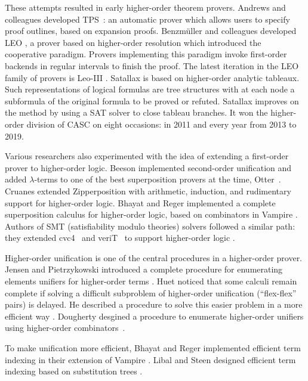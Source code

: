 These attempts resulted in early higher-order theorem provers. Andrews and
colleagues developed TPS~\cite{abinpx-96-tps}: an automatic prover which allows
users to specify proof outlines, based on expansion proofs. Benzm\"uller and
colleagues developed LEO \cite{cbmk-98-leo}, a prover based on higher-order
resolution which introduced the cooperative paradigm. Provers implementing this
paradigm invoke first-order backends in regular intervals to finish the proof.
The latest iteration in the LEO family of provers is Leo-III \cite{sb-21-leo3}.
Satallax \cite{cb-12-satallax} is based on higher-order analytic tableaux. Such
representations of logical formulas are tree structures with at each node a
subformula of the original formula to be proved or refuted. Satallax improves on
the method by using a SAT solver to close tableau branches.
It won the higher-order division of CASC on eight occasions: in 2011 and every
year from 2013 to 2019.

Various researchers also experimented with the idea of extending a first-order
prover to higher-order logic. Beeson \cite{mb-04-lam-logic} implemented second-order
unification and added $\lambda$-terms to one of the best superposition
provers at the time, Otter~\cite{mcc-03-otter}. Cruanes extended Zipperposition
\cite{sc-15-simon-phd,sc-supind-17} with arithmetic, induction, and rudimentary support for
higher-order logic. Bhayat and Reger implemented a complete superposition
calculus  for higher-order logic, based on combinators  in Vampire
\cite{br-20-full-sup-w-combs}. Authors of SMT (satisfiability modulo theories) solvers followed a similar path:
they extended cvc4~\cite{cbetal-11-cvc4} and veriT~\cite{bodf-09-veriT} to
support higher-order logic \cite{brotb-19-ho-smt}.

Higher-order unification is one of the central procedures in a higher-order
prover. Jensen and Pietrzykowski introduced a complete procedure for enumerating
elements unifiers for higher-order terms \cite{jp-76-unif}. Huet noticed that
some calculi remain complete if solving a difficult subproblem of higher-order
unification (``flex-flex'' pairs) is delayed. He described a procedure to solve
this easier problem in a more efficient way \cite{gh-75-unification}. Dougherty
desgined a procedure to enumerate higher-order unifiers using higher-order
combinators~\cite{dd-93-comb-unif}. 

To make unification more efficient, Bhayat
and Reger implemented efficient term indexing in their extension of Vampire
\cite{br-20-full-sup-w-combs}. Libal and Steen designed efficient term indexing
based on substitution trees \cite{ls-16-indexing}.

